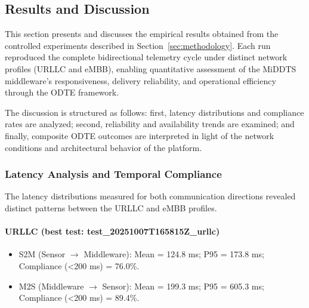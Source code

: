 \subsection{Results and Discussion}

This section presents and discusses the empirical results obtained from the controlled experiments described in Section~\ref{sec:methodology}. Each run reproduced the complete bidirectional telemetry cycle under distinct network profiles (URLLC and eMBB), enabling quantitative assessment of the MiDDTS middleware's responsiveness, delivery reliability, and operational efficiency through the ODTE framework.

The discussion is structured as follows: first, latency distributions and compliance rates are analyzed; second, reliability and availability trends are examined; and finally, composite ODTE outcomes are interpreted in light of the network conditions and architectural behavior of the platform.

\subsubsection{Latency Analysis and Temporal Compliance}

The latency distributions measured for both communication directions revealed distinct patterns between the URLLC and eMBB profiles.

\paragraph{URLLC (best test: test_20251007T165815Z_urllc)}
\begin{itemize}
  \item S2M (Sensor $\rightarrow$ Middleware): Mean = 124.8 ms; P95 = 173.8 ms; Compliance (<200 ms) = 76.0\%.
  \item M2S (Middleware $\rightarrow$ Sensor): Mean = 199.3 ms; P95 = 605.3 ms; Compliance (<200 ms) = 89.4\%.
\end{itemize}

